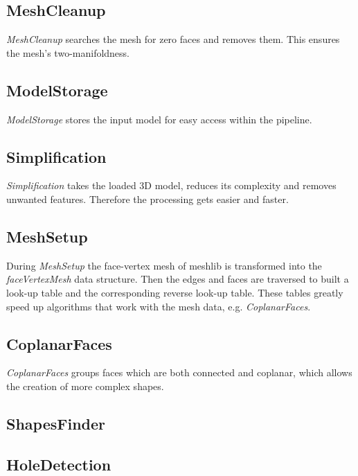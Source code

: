 \documentclass[../ClassicThesis.tex]{subfiles}
\begin{document}
\subsection*{MeshCleanup}

\emph{MeshCleanup} searches the mesh for zero faces and removes them. This ensures the mesh's two-manifoldness.


\subsection*{ModelStorage}

\emph{ModelStorage} stores the input model for easy access within the pipeline.


\subsection*{Simplification}

\emph{Simplification} takes the loaded 3D model, reduces its complexity and removes unwanted features. Therefore the processing gets easier and faster. 


\subsection*{MeshSetup}

During \emph{MeshSetup} the face-vertex mesh of meshlib is transformed into the \emph{faceVertexMesh} data structure. Then the edges and faces are traversed to built a look-up table and the corresponding reverse look-up table. These tables greatly speed up algorithms that work with the mesh data, e.g. \emph{CoplanarFaces}.


\subsection*{CoplanarFaces}

\emph{CoplanarFaces} groups faces which are both connected and coplanar, which allows the creation of more complex shapes.


\subsection*{ShapesFinder}




\subsection*{HoleDetection}
\end{document}
